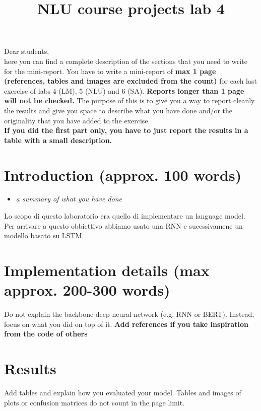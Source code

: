 \documentclass[a4paper]{article}
\title{NLU course projects lab 4}
\begin{document}
\maketitle

Dear students, \\
here you can find a complete description of the sections that you need to write for the mini-report. You have to write a mini-report of \textbf{max 1 page (references, tables and images are excluded from the count)} for each last exercise of labs 4 (LM), 5  (NLU) and 6 (SA). \textbf{Reports longer than 1 page will not be checked.} The purpose of this is to give you a way to report cleanly the results and give you space to describe what you have done and/or the originality that you have added to the exercise.
\\
\textbf{If you did the first part only, you have to just report the results in a table with a small description.}

\section{Introduction (approx. 100 words)}
\begin{itemize}
    \item \textit{a summary of what you have done}
\end{itemize}
Lo scopo di questo laboratorio era quello di implementare un language model.
Per arrivare a questo obbiettivo abbiamo usato una RNN e sucessivamene un modello basato su LSTM.


\section{Implementation details (max approx. 200-300 words)}
Do not explain the backbone deep neural network (e.g. RNN or BERT). Instead, focus on what you did on top of it. \textbf{Add references if you take inspiration from the code of others}

\section{Results}
Add tables and explain how you evaluated your model. Tables and images of plots or confusion matrices do not count in the page limit.






\end{document}
